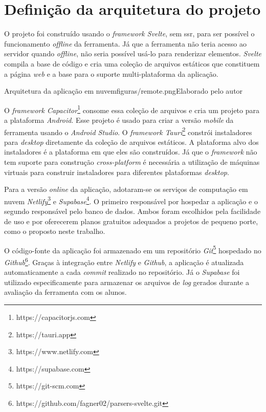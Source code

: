 \section{Definição da arquitetura do projeto}
O projeto foi construído usando o \textit{framework Svelte}, sem \gls{ssr}, para ser possível o funcionamento \textit{offline} da ferramenta. Já que a ferramenta não teria acesso ao servidor quando \textit{offline}, não seria possível usá-lo para renderizar elementos. \textit{Svelte} compila a base de código e cria uma coleção de arquivos estáticos que constituem a página \textit{web} e a base para o suporte multi-plataforma da aplicação.

\begin{mypicture}{\label{fig:arqremo}}{Arquitetura da aplicação em nuvem}{figuras/remote.png}{Elaborado pelo autor}
\end{mypicture}

O \textit{framework Capacitor}\footnote{https://capacitorjs.com} consome essa coleção de arquivos e cria um projeto para a plataforma \textit{Android}. Esse projeto é usado para criar a versão \textit{mobile} da ferramenta usando o \textit{Android Studio}. O \textit{framework Tauri}\footnote{https://tauri.app} constrói instaladores para \textit{desktop} diretamente da coleção de arquivos estáticos. A plataforma alvo dos instaladores é a plataforma em que eles são construídos. Já que o \textit{framework} não tem suporte para construção \textit{cross-platform} é necessária a utilização de máquinas virtuais para construir instaladores para diferentes plataformas \textit{desktop}.

Para a versão \textit{online} da aplicação, adotaram-se os serviços de computação em nuvem \textit{Netlify}\footnote{https://www.netlify.com} e \textit{Supabase}\footnote{https://supabase.com}. O primeiro responsável por hospedar a aplicação e o segundo responsável pelo banco de dados. Ambos foram escolhidos pela facilidade de uso e por oferecerem planos gratuitos adequados a projetos de pequeno porte, como o proposto neste trabalho.

O código-fonte da aplicação foi armazenado em um repositório \textit{Git}\footnote{https://git-scm.com} hospedado no \textit{Github}\footnote{https://github.com/fagner02/parsers-svelte.git}. Graças à integração entre \textit{Netlify} e \textit{Github}, a aplicação é atualizada automaticamente a cada \textit{commit} realizado no repositório. Já o \textit{Supabase} foi utilizado especificamente para armazenar os arquivos de \textit{log} gerados durante a avaliação da ferramenta com os alunos.

